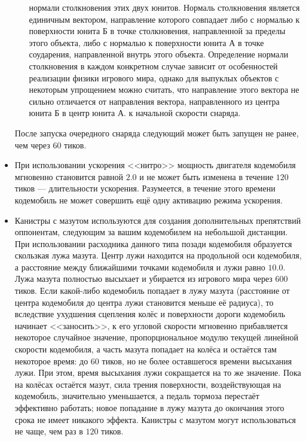 \begin{itemize}
\begin{itemize}
{                нормали столкновения этих двух юнитов. Нормаль столкновения является единичным вектором, направление которого совпадает либо
                с нормалью к поверхности юнита Б в точке столкновения, направленной за пределы этого объекта, либо с нормалью к поверхности
                юнита А в точке соударения, направленной внутрь этого объекта. Определение нормали столкновения в каждом конкретном случае
                зависит от особенностей реализации физики игрового мира, однако для выпуклых объектов с некоторым упрощением можно считать,
                что направление этого вектора не сильно отличается от направления вектора, направленного из центра юнита Б в центр юнита А.}
                к начальной скорости снаряда.
        \end{itemize}
        После запуска очередного снаряда следующий может быть запущен не ранее, чем через $60$ тиков.
  \item При использовании ускорения <<нитро>> мощность двигателя кодемобиля мгновенно становится равной $2.0$ и не может быть изменена в
        течение $120$ тиков --- длительности ускорения. Разумеется, в течение этого времени кодемобиль не может совершить ещё одну активацию
        режима ускорения.
  \item Канистры с мазутом используются для создания дополнительных препятствий оппонентам, следующим за вашим кодемобилем на небольшой
        дистанции. При использовании расходника данного типа позади кодемобиля образуется скользкая лужа мазута. Центр лужи находится на
        продольной оси кодемобиля, а расстояние между ближайшими точками кодемобиля и лужи равно $10.0$. Лужа мазута полностью высыхает и
        убирается из игрового мира через $600$ тиков. Если какой-либо кодемобиль попадает в лужу мазута (расстояние от центра кодемобиля до
        центра лужи становится меньше её радиуса), то вследствие ухудшения сцепления колёс и поверхности дороги кодемобиль начинает
        <<заносить>>, к его угловой скорости мгновенно прибавляется некоторое случайное значение, пропорциональное модулю текущей линейной
        скорости кодемобиля, а часть мазута попадает на колёса и остаётся там некоторое время: до $60$ тиков, но не более оставшегося
        времени высыхания лужи. При этом, время высыхания лужи сокращается на то же значение. Пока на колёсах остаётся мазут, сила трения
        поверхности, воздействующая на кодемобиль, значительно уменьшается, а педаль тормоза перестаёт эффективно работать; новое попадание
        в лужу мазута до окончания этого срока не имеет никакого эффекта. Канистры с мазутом могут использоваться не чаще, чем раз в $120$
        тиков.
\end{itemize}

